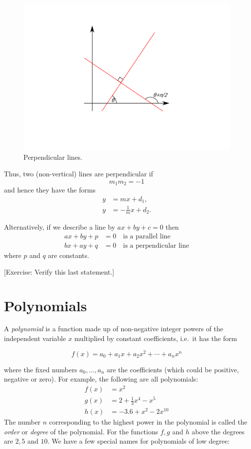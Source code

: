 \documentclass[
]{book}
\theoremstyle{definition}
\theoremstyle{definition}
\theoremstyle{definition}
\theoremstyle{definition}
\theoremstyle{remark}
\begin{document}
\begin{figure}
\includegraphics{figures/perpendicular} \caption{Perpendicular lines.}\label{fig:perpendicular}
\end{figure}

Thus, two (non-vertical) lines are perpendicular if
\begin{equation*}
m_1m_2=-1
\end{equation*}
and hence they have the forms
\begin{align*}
y&=mx + d_1,\\
y&=-\frac{1}{m}x + d_2.
\end{align*}

Alternatively, if we describe a line by \(ax+by+c=0\) then
\begin{align*}
ax+by+p&=0\quad\text{is a parallel line}\\
bx+ay+q&=0\quad\text{is a perpendicular line}
\end{align*}
where \(p\) and \(q\) are constants.

{[}Exercise: Verify this last statement.{]}

\hypertarget{polynomials}{%
\section{Polynomials}\label{polynomials}}

A \emph{polynomial} is a function made up of non-negative integer powers of the independent variable \(x\) multiplied by constant coefficients, i.e.~it has the form

\[f(x)=a_0 + a_1 x + a_2 x^2 + \dotsb + a_n x^n\]

where the fixed numbers \(a_0,\dots,a_n\) are the coefficients (which could be positive, negative or zero). For example, the following are all polynomials:
\begin{align*}f(x)&=x^2\\
g(x)&=2+\frac{1}{3}x^4 - x^5\\
h(x)&=-3.6 + x^2 -2x^10
\end{align*}
The number \(n\) corresponding to the highest power in the polynomial is called the \emph{order} or \emph{degree} of the polynomial. For the functions \(f, g\) and \(h\) above the degrees are \(2, 5\) and \(10\). We have a few special names for polynomials of low degree:
\end{document}

